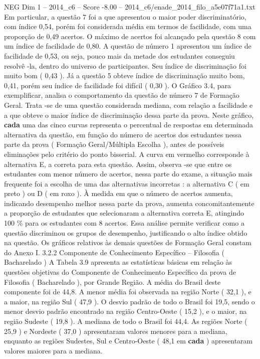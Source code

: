 \begin{textsample}{NEG Dim 1 – 2014\_c6 – Score -8.00 – 2014\_c6/enade\_2014\_filo\_a5e07f71a1.txt}
Em particular, a questão 7 foi a que apresentou o maior poder discriminatório, com índice 0,54, porém foi considerada média em termos de facilidade, com uma proporção de 0,49 acertos.
O máximo de acertos foi alcançado pela questão 8 com um índice de facilidade de 0,80.
A questão de número 1 apresentou um índice de facilidade de 0,53, ou seja, pouco mais da metade dos estudantes conseguiu resolvê -la, dentro do universo de participantes.
Seu índice de discriminação foi muito bom ( 0,43 ).
Já a questão 5 obteve índice de discriminação muito bom, 0,41, porém seu índice de facilidade foi difícil ( 0,30 ).
O Gráfico 3.4, para exemplificar, analisa o comportamento da questão de número 7 de Formação Geral.
Trata -se de uma questão considerada mediana, com relação a facilidade e a que obteve o maior índice de discriminação dessa parte da prova.
Neste gráfico, \textbf{cada} uma das cinco curvas representa o percentual de respostas em determinada alternativa da questão, em função do número de acertos dos estudantes nessa parte da prova ( Formação Geral/Múltipla Escolha ), antes de possíveis eliminações pelo critério do ponto bisserial.
A curva em vermelho corresponde à alternativa E, a correta para esta questão.
Assim, observa -se que entre os estudantes com menor número de acertos, nessa parte do exame, a situação mais frequente foi a escolha de uma das alternativas incorretas : a alternativa C ( em preto ) ou D ( em roxo ).
À medida em que o número de acertos aumenta, indicando desempenho melhor nessa parte da prova, aumenta concomitantemente a proporção de estudantes que selecionaram a alternativa correta E, atingindo 100 \% para os estudantes com 8 acertos.
Essa análise permite verificar como a questão discriminou os grupos de desempenho, justificando o alto índice obtido na questão.
Os gráficos relativos às demais questões de Formação Geral constam do Anexo I. 3.2.2 Componente de Conhecimento Específico – Filosofia ( Bacharelado ) A Tabela 3.9 apresenta as estatísticas básicas em relação às questões objetivas do Componente de Conhecimento Específico da prova de Filosofia ( Bacharelado ), por Grande Região.
A média do Brasil deste componente foi de 44,8.
A menor média foi observada na região Norte ( 32,1 ), e a maior, na região Sul ( 47,9 ).
O desvio padrão de todo o Brasil foi 19,5, sendo o menor desvio padrão encontrado na região Centro-Oeste ( 15,2 ), e o maior, na região Sudeste ( 19,8 ).
A mediana de todo o Brasil foi 44,4.
As regiões Norte ( 25,9 ) e Nordeste ( 37,0 ) apresentaram valores menores para a mediana, enquanto as regiões Sudestes, Sul e Centro-Oeste ( 48,1 em \textbf{cada} ) apresentaram valores maiores para a mediana.

\end{textsample}

